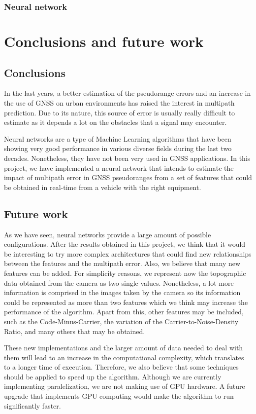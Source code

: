 \documentclass[a4paper, report, oneside, UKenglish]{memoir}
\begin{document}
\subsection{Neural network}



\chapter{Conclusions and future work}\label{ch:conclusions}
\section{Conclusions}
In the last years, a better estimation of the pseudorange errors and an increase in the use of GNSS on urban environments has raised the interest in multipath prediction. Due to its nature, this source of error is usually really difficult to estimate as it depends a lot on the obstacles that a signal may encounter. 

Neural networks are a type of Machine Learning algorithms that have been showing very good performance in various diverse fields during the last two decades. Nonetheless, they have not been very used in GNSS applications. In this project, we have implemented a neural network that intends to estimate the impact of multipath error in GNSS pseudoranges from a set of features that could be obtained in real-time from a vehicle with the right equipment.


\section{Future work}
As we have seen, neural networks provide a large amount of possible configurations. After the results obtained in this project, we think that it would be interesting to try more complex architectures that could find new relationships between the features and the multipath error. Also, we believe that many new features can be added. For simplicity reasons, we represent now the topographic data obtained from the camera as two single values. Nonetheless, a lot more information is comprised in the images taken by the camera so its information could be represented as more than two features which we think may increase the performance of the algorithm. Apart from this, other features may be included, such as the Code-Minus-Carrier, the variation of the Carrier-to-Noise-Density Ratio, and many others that may be obtained.

These new implementations and the larger amount of data needed to deal with them will lead to an increase in the computational complexity, which translates to a longer time of execution. Therefore, we also believe that some techniques should be applied to speed up the algorithm. Although we are currently implementing paralelization, we are not making use of GPU hardware. A future upgrade that implements GPU computing would make the algorithm to run significantly faster.


\clearpage
\printbibliography
\end{document}
